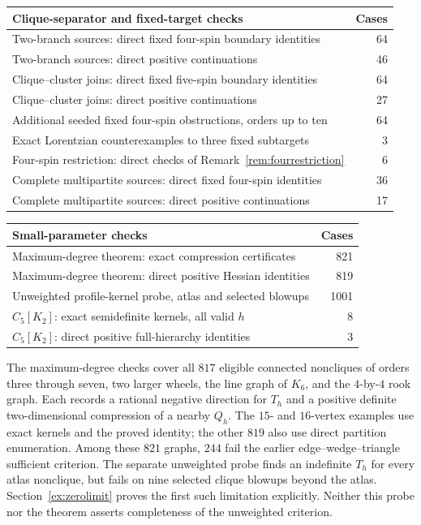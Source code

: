 \documentclass[11pt]{article}
\theoremstyle{remark}
\begin{document}
\begin{center}
\begin{tabular}{@{}p{9.0cm}r@{}}
\toprule
Clique-separator and fixed-target checks & Cases\\
\midrule
Two-branch sources: direct fixed four-spin boundary identities &64\\
Two-branch sources: direct positive continuations &46\\
Clique--cluster joins: direct fixed five-spin boundary identities &64\\
Clique--cluster joins: direct positive continuations &27\\
Additional seeded fixed four-spin obstructions, orders up to ten &64\\
Exact Lorentzian counterexamples to three fixed subtargets &3\\
Four-spin restriction: direct checks of Remark~\ref{rem:fourrestriction} &6\\
Complete multipartite sources: direct fixed four-spin identities &36\\
Complete multipartite sources: direct positive continuations &17\\
\bottomrule
\end{tabular}
\end{center}

\begin{center}
\begin{tabular}{@{}p{9.0cm}r@{}}
\toprule
Small-parameter checks & Cases\\
\midrule
Maximum-degree theorem: exact compression certificates &821\\
Maximum-degree theorem: direct positive Hessian identities &819\\
Unweighted profile-kernel probe, atlas and selected blowups &1001\\
$C_5[K_2]$: exact semidefinite kernels, all valid $h$ &8\\
$C_5[K_2]$: direct positive full-hierarchy identities &3\\
\bottomrule
\end{tabular}
\end{center}

The maximum-degree checks cover all $817$ eligible connected noncliques
of orders three through seven, two larger wheels, the line graph of
$K_6$, and the $4$-by-$4$ rook graph. Each records a rational negative
direction for $T_h$ and a positive definite two-dimensional compression
of a nearby $Q_h$. The $15$- and $16$-vertex examples use exact kernels
and the proved identity; the other $819$ also use direct partition
enumeration. Among these $821$ graphs, $244$ fail the earlier
edge--wedge--triangle sufficient criterion. The separate unweighted
probe finds an indefinite $T_h$ for every atlas nonclique, but fails
on nine selected clique blowups beyond the atlas. Section~\ref{ex:zerolimit}
proves the first such limitation explicitly. Neither this probe nor
the theorem asserts completeness of the unweighted criterion.
\end{document}
